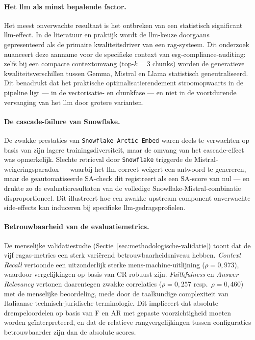 \paragraph{Het \gls{llm} als minst bepalende factor.}
Het meest onverwachte resultaat is het ontbreken van een statistisch significant \gls{llm}-effect. In de literatuur en praktijk wordt de \gls{llm}-keuze doorgaans gepresenteerd als de primaire kwaliteitsdriver van een \gls{rag}-systeem. Dit onderzoek nuanceert deze aanname voor de specifieke context van \gls{esg}-compliance-auditing: zelfs bij een compacte contextomvang (top-$k = 3$ chunks) worden de generatieve kwaliteitsverschillen tussen Gemma, Mistral en Llama statistisch geneutraliseerd. Dit benadrukt dat het praktische optimalisatierendement stroomopwaarts in de pipeline ligt — in de vectorisatie- en chunkfase — en niet in de voortdurende vervanging van het \gls{llm} door grotere varianten.

\paragraph{De cascade-failure van Snowflake.}
De zwakke prestaties van \texttt{Snowflake Arctic Embed} waren deels te verwachten op basis van zijn lagere trainingsdiversiteit, maar de omvang van het cascade-effect was opmerkelijk. Slechte retrieval door \texttt{Snowflake} triggerde de Mistral-weigeringsparadox — waarbij het \gls{llm} correct weigert een antwoord te genereren, maar de geautomatiseerde SA-check dit registreert als een SA-score van nul — en drukte zo de evaluatieresultaten van de volledige Snowflake-Mistral-combinatie disproportioneel. Dit illustreert hoe een zwakke upstream component onverwachte side-effects kan induceren bij specifieke \gls{llm}-gedragsprofielen.

\paragraph{Betrouwbaarheid van de evaluatiemetrics.}
De menselijke validatiestudie (Sectie~\ref{sec:methodologische-validatie}) toont dat de vijf \gls{ragas}-metrics een sterk variërend betrouwbaarheidsniveau hebben. \textit{Context Recall} vertoonde een uitzonderlijk sterke mens-machine-uitlijning ($\rho = 0{,}973$), waardoor vergelijkingen op basis van CR robuust zijn. \textit{Faithfulness} en \textit{Answer Relevancy} vertonen daarentegen zwakke correlaties ($\rho = 0{,}257$ resp.\ $\rho = 0{,}460$) met de menselijke beoordeling, mede door de taalkundige complexiteit van Italiaanse technisch-juridische terminologie. Dit impliceert dat absolute drempeloordelen op basis van F en AR met gepaste voorzichtigheid moeten worden geïnterpreteerd, en dat de relatieve rangvergelijkingen tussen configuraties betrouwbaarder zijn dan de absolute scores.

